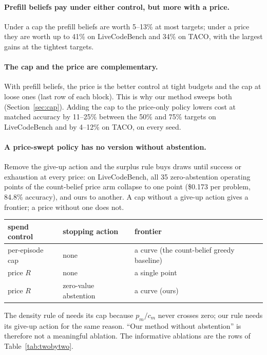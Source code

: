 \documentclass[10pt]{article} %
\begin{document}
\paragraph{Prefill beliefs pay under either control, but more with a price.}
Under a cap the prefill beliefs are worth 5--13\% at most targets; under a price they are worth
up to 41\% on LiveCodeBench and 34\% on TACO, with the largest gains at the tightest targets.

\paragraph{The cap and the price are complementary.}
With prefill beliefs, the price is the better control at tight budgets and the cap at loose ones
(last row of each block).  This is why our method sweeps both (Section~\ref{sec:cap}).  Adding
the cap to the price-only policy lowers cost at matched accuracy by 11--25\% between the 50\% and
75\% targets on LiveCodeBench and by 4--12\% on TACO, on every seed.

\paragraph{A price-swept policy has no version without abstention.}
Remove the give-up action and the surplus rule buys draws until success or exhaustion at every
price: on LiveCodeBench, all 35 zero-abstention operating points of the count-belief price arm
collapse to one point (\$0.173 per problem, 84.8\% accuracy), and ours to another.  A cap without
a give-up action gives a frontier; a price without one does not.
\begin{center}
\small
\begin{tabular}{lll}
\toprule
spend control & stopping action & frontier \\
\midrule
per-episode cap & none & a curve (the count-belief greedy baseline) \\
price $R$ & none & a single point \\
price $R$ & zero-value abstention & a curve (ours) \\
\bottomrule
\end{tabular}
\end{center}
The density rule of \citet{chen2026ror} needs its cap because $p_m/c_m$ never crosses zero; our
rule needs its give-up action for the same reason.  ``Our method without abstention'' is therefore
not a meaningful ablation.  The informative ablations are the rows of Table~\ref{tab:twobytwo}.
\end{document}
